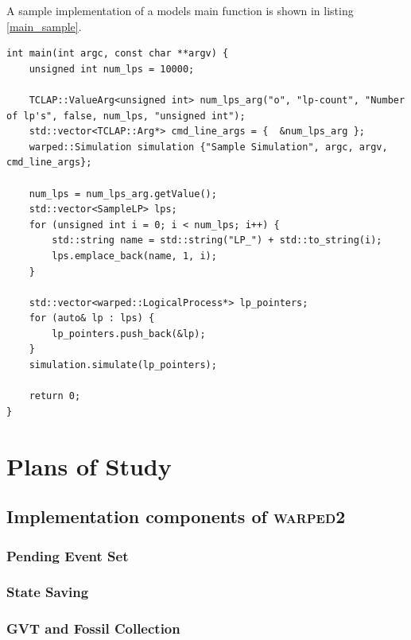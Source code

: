 \documentclass[11pt]{book}
\begin{document}
\noindent
A sample implementation of a models main function is shown in listing \ref{main_sample}.

\begin{lstlisting}[caption=Sample \textsc{warped2} Main Definition, label=main_sample, float]
int main(int argc, const char **argv) {
    unsigned int num_lps = 10000;

    TCLAP::ValueArg<unsigned int> num_lps_arg("o", "lp-count", "Number of lp's", false, num_lps, "unsigned int");
    std::vector<TCLAP::Arg*> cmd_line_args = {  &num_lps_arg };
    warped::Simulation simulation {"Sample Simulation", argc, argv, cmd_line_args};

    num_lps = num_lps_arg.getValue();
    std::vector<SampleLP> lps;
    for (unsigned int i = 0; i < num_lps; i++) {
        std::string name = std::string("LP_") + std::to_string(i);
        lps.emplace_back(name, 1, i);
    }

    std::vector<warped::LogicalProcess*> lp_pointers;
    for (auto& lp : lps) {
        lp_pointers.push_back(&lp);
    }
    simulation.simulate(lp_pointers);

    return 0;
}
\end{lstlisting}


\chapter{Plans of Study}\label{plans_of_study}


\section{Implementation components of \textsc{warped2}}

\subsection{Pending Event Set}

\subsection{State Saving}

\subsection{GVT and Fossil Collection}
\end{document}
